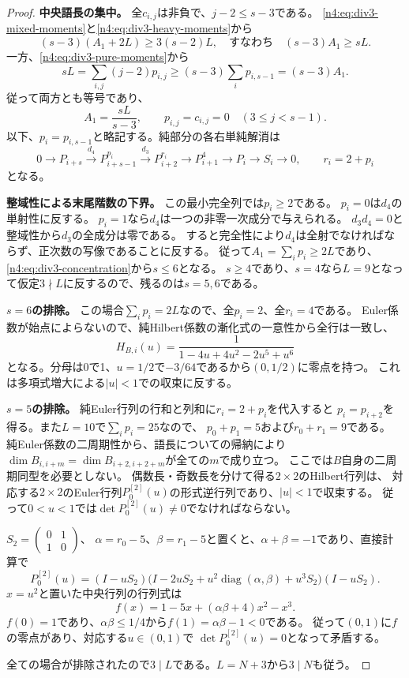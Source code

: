 \documentclass[11pt,a4paper]{ltjsarticle}
\theoremstyle{definition}
\begin{document}
\begin{proof}
\par\smallskip\noindent\textbf{中央語長の集中。}\quad
全$c_{i,j}$は非負で、$j-2\le s-3$である。
\eqref{n4:eq:div3-mixed-moments}と\eqref{n4:eq:div3-heavy-moments}から
\[
 (s-3)(A_1+2L)\ge3(s-2)L,
 \quad\text{すなわち}\quad (s-3)A_1\ge sL.
\]
一方、\eqref{n4:eq:div3-pure-moments}から
\[
 sL=\sum_{i,j}(j-2)p_{i,j}
 \ge(s-3)\sum_i p_{i,s-1}=(s-3)A_1.
\]
従って両方とも等号であり、
\begin{equation}\label{n4:eq:div3-concentration}
 A_1=\frac{sL}{s-3},\qquad
 p_{i,j}=c_{i,j}=0\quad(3\le j<s-1).
\end{equation}
以下、$p_i=p_{i,s-1}$と略記する。純部分の各右単純解消は
\[
 0\longrightarrow P_{i+s}
 \xrightarrow{d_4}P_{i+s-1}^{p_i}
 \xrightarrow{d_3}P_{i+2}^{r_i}
 \longrightarrow P_{i+1}^{4}\longrightarrow P_i\longrightarrow S_i\longrightarrow0,
 \qquad r_i=2+p_i
\]
となる。

\par\smallskip\noindent\textbf{整域性による末尾階数の下界。}\quad
この最小完全列では$p_i\ge2$である。
$p_i=0$は$d_4$の単射性に反する。
$p_i=1$なら$d_4$は一つの非零一次成分で与えられる。
$d_3d_4=0$と整域性から$d_3$の全成分は零である。
すると完全性により$d_4$は全射でなければならず、正次数の写像であることに反する。
従って$A_1=\sum_i p_i\ge2L$であり、\eqref{n4:eq:div3-concentration}から$s\le6$となる。
$s\ge4$であり、$s=4$なら$L=9$となって仮定$3\nmid L$に反するので、残るのは$s=5,6$である。

\par\smallskip\noindent\textbf{$s=6$の排除。}\quad
この場合$\sum_i p_i=2L$なので、全$p_i=2$、全$r_i=4$である。
Euler係数が始点によらないので、純Hilbert係数の漸化式の一意性から全行は一致し、
\[
 H_{B,i}(u)=\frac1{1-4u+4u^2-2u^5+u^6}
\]
となる。分母は0で1、$u=1/2$で$-3/64$であるから$(0,1/2)$に零点を持つ。
これは多項式増大による$|u|<1$での収束に反する。

\par\smallskip\noindent\textbf{$s=5$の排除。}\quad
純Euler行列の行和と列和に$r_i=2+p_i$を代入すると
$p_i=p_{i+2}$を得る。また$L=10$で$\sum_i p_i=25$なので、
$p_0+p_1=5$および$r_0+r_1=9$である。
純Euler係数の二周期性から、語長についての帰納により
$\dim B_{i,i+m}=\dim B_{i+2,i+2+m}$が全ての$m$で成り立つ。
ここでは$B$自身の二周期同型を必要としない。
偶数長・奇数長を分けて得る$2\times2$のHilbert行列は、
対応する$2\times2$のEuler行列$P_0^{[2]}(u)$の形式逆行列であり、$|u|<1$で収束する。
従って$0<u<1$では$\det P_0^{[2]}(u)\ne0$でなければならない。

$S_2=\left(\begin{smallmatrix}0&1\\1&0\end{smallmatrix}\right)$、
$\alpha=r_0-5$、$\beta=r_1-5$と置くと、$\alpha+\beta=-1$であり、直接計算で
\[
 P_0^{[2]}(u)=(I-uS_2)
 \bigl(I-2uS_2+u^2\operatorname{diag}(\alpha,\beta)+u^3S_2\bigr)
 (I-uS_2).
\]
$x=u^2$と置いた中央行列の行列式は
\[
 f(x)=1-5x+(\alpha\beta+4)x^2-x^3.
\]
$f(0)=1$であり、$\alpha\beta\le1/4$から$f(1)=\alpha\beta-1<0$である。
従って$(0,1)$に$f$の零点があり、対応する$u\in(0,1)$で
$\det P_0^{[2]}(u)=0$となって矛盾する。

全ての場合が排除されたので$3\mid L$である。$L=N+3$から$3\mid N$も従う。
\end{proof}
\end{document}
